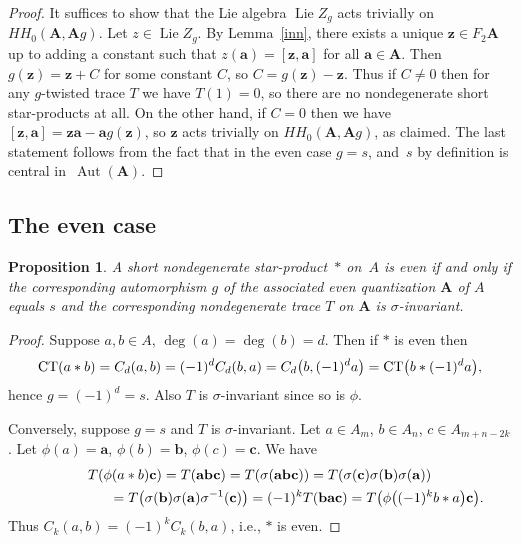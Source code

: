 \documentclass[pdftex]{sigma}
\numberwithin{equation}{section}
\newtheorem{Proposition}[Theorem]{Proposition}
\begin{document}
\begin{proof} It suffices to show that the Lie algebra $\operatorname{Lie}Z_g$ acts trivially on
$HH_0({\mathbf A},{\mathbf A} g)$. Let $z\in \operatorname{Lie}Z_g$. By Lemma~\ref{inn}, there exists a unique ${\mathbf z}\in F_2{\mathbf A}$ up to adding a constant such that $z({\mathbf a})=[{\mathbf z},{\mathbf a}]$ for all ${\mathbf a}\in {\mathbf A}$. Then $g({\mathbf z})={\mathbf z}+C$ for some constant $C$, so $C=g({\mathbf z})-{\mathbf z}$. Thus if $C\ne 0$ then for any $g$-twisted trace $T$ we have $T(1)=0$, so there are no nondegenerate short star-products at all. On the other hand, if $C=0$ then we have $[{\mathbf z},{\mathbf a}]={\mathbf z}{\mathbf a}-{\mathbf a}g({\mathbf z})$, so ${\mathbf z}$ acts trivially on $HH_0({\mathbf A},{\mathbf A} g)$, as claimed. The last statement follows from the fact that in the even case $g=s$, and~$s$ by definition is central in~$\operatorname{Aut}({{\mathbf A}})$.
\end{proof}

\subsection{The even case}

\begin{Proposition}\label{criteven} A short nondegenerate star-product~$*$ on~$A$ is even if and only if the corresponding automorphism $g$ of the associated even quantization ${\mathbf A}$ of $A$ equals $s$ and the corresponding nondegenerate trace $T$ on ${\mathbf A}$ is $\sigma$-invariant.
\end{Proposition}

\begin{proof} Suppose $a,b\in A$, $\deg(a)=\deg(b)=d$. Then if $*$ is even then
\begin{gather*}
{\rm CT}(a*b)=C_d(a,b)=(-1)^dC_d(b,a)=C_d\big(b,(-1)^da\big)={\rm CT}\big(b*(-1)^da\big),
\end{gather*}
hence $g=(-1)^d=s$. Also $T$ is $\sigma$-invariant since so is $\phi$.

Conversely, suppose $g=s$ and $T$ is $\sigma$-invariant. Let $a\in A_m$, $b\in A_n$, $c\in A_{m+n-2k}$.
Let $\phi(a)={\mathbf a}$, $\phi(b)={\mathbf b}$, $\phi(c)={\mathbf c}$. We have
\begin{gather*}
T(\phi(a*b){\mathbf c})=T({\mathbf a}{\mathbf b}{\mathbf c})=T(\sigma({\mathbf a}{\mathbf b}{\mathbf c}))=
T(\sigma({\mathbf c})\sigma({\mathbf b})\sigma({\mathbf a}))\\
\hphantom{T(\phi(a*b){\mathbf c})}{}
=T\big(\sigma({\mathbf b})\sigma({\mathbf a})\sigma^{-1}({\mathbf c})\big)=(-1)^kT({\mathbf b}{\mathbf a}{\mathbf c})=T\big(\phi\big((-1)^kb*a\big){\mathbf c}\big).
\end{gather*}
Thus $C_k(a,b)=(-1)^kC_k(b,a)$, i.e., $*$ is even.
\end{proof}
\end{document}
